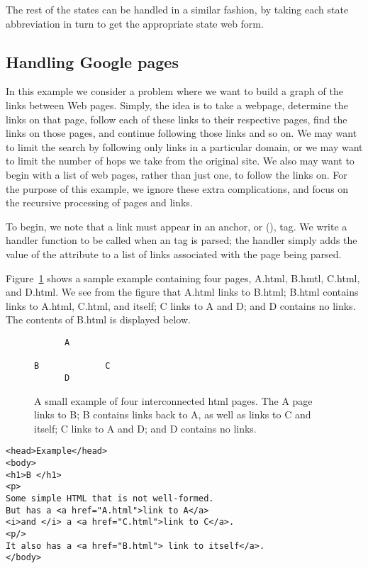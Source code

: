 The rest of the states can be handled in a similar fashion,
by taking each state abbreviation in turn to get the appropriate
state web form.

\subsection{Handling Google pages}

In this example we consider a problem where we want to build a graph
of the links between Web pages.  Simply, the idea is to take a
webpage, determine the links on that page, follow each of these links
to their respective pages, find the links on those pages, and continue
following those links and so on.  We may want to limit the search by
following only links in a particular domain, or we may want to limit
the number of hops we take from the original site.  We also may want
to begin with a list of web pages, rather than just one, to follow the
links on.  For the purpose of this example, we ignore these extra
complications, and focus on the recursive processing of pages and
links.

To begin, we note that a link must appear in an anchor, or (), tag.
We write a handler function to be called when an  tag is parsed;
the handler simply adds the value of the  attribute to a 
list of links associated with the page being parsed.

Figure~\ref{fig:ABClinks} shows a sample example containing four pages, 
A.html, B.hmtl, C.html, and D.html. 
We see from the figure that A.html links to B.html;
B.html contains links to A.html, C.html, and itself; 
C links to A and D; and D contains no links. 
The contents of B.html is displayed below.

\begin{figure}
\begin{verbatim}
      A

B             C
      D
\end{verbatim}
\caption{A small example of four interconnected html pages. 
The A page links to B; B contains links back to A, as well as 
links to C and itself; C links to A and D; and D contains no links. }
\label{fig:ABClinks}
\end{figure}

\begin{verbatim}
<head>Example</head>
<body>
<h1>B </h1>
<p>
Some simple HTML that is not well-formed.
But has a <a href="A.html">link to A</a>
<i>and </i> a <a href="C.html">link to C</a>.
<p/>
It also has a <a href="B.html"> link to itself</a>.
</body>
\end{verbatim}

